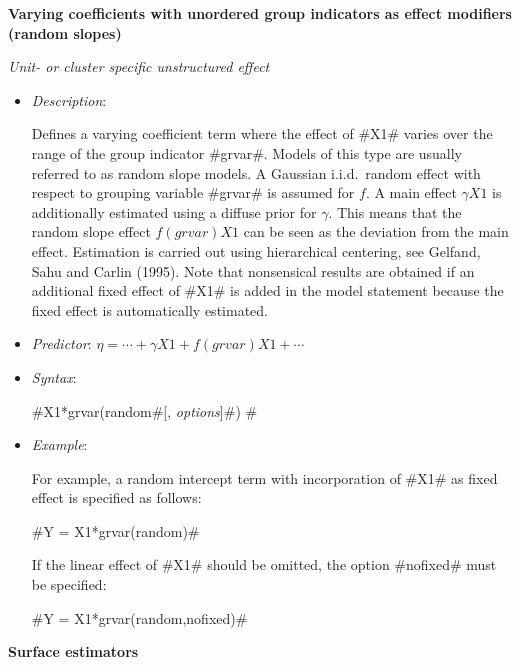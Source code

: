 {\bf Varying coefficients with unordered group indicators as effect modifiers \\
(random slopes)}
\medskip

{\em Unit- or cluster specific unstructured effect}
\begin{itemize}
\item[] {\em Description}:

Defines a varying coefficient term where the effect of #X1# varies
over the range of the group indicator #grvar#. Models of this type
are usually referred to as random slope models. A  Gaussian
i.i.d.~random effect with respect to grouping variable #grvar# is
assumed for $f$. A main effect $\gamma X1$ is additionally
estimated using a diffuse prior for $\gamma$. This means that the
random slope effect $f(grvar)X1$ can be seen as the deviation from
the main effect. Estimation is carried out using hierarchical
centering, see Gelfand, Sahu and Carlin (1995). Note that
nonsensical results are obtained if an additional fixed effect of
#X1# is added in the model statement because the fixed effect is
automatically estimated.
\item[] {\em Predictor}: $\eta = \cdots + \gamma X1 + f(grvar)X1 + \cdots$
\item[] {\em Syntax}:

#X1*grvar(random#[, {\em options}]#) #
\item[] {\em Example}:

For example, a random intercept term with incorporation of #X1# as
fixed effect is specified as follows:

#Y = X1*grvar(random)#

If the linear effect of #X1# should be omitted, the option
#nofixed# must be specified:

#Y = X1*grvar(random,nofixed)#
\end{itemize}


{\bf Surface estimators}
\medskip

